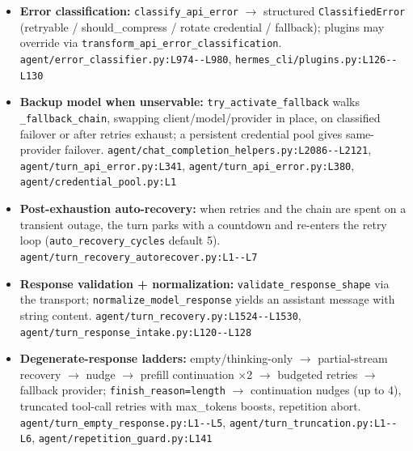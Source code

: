 \begin{itemize}
\item \textbf{Error classification:} \texttt{classify\_\allowbreak{}api\_\allowbreak{}error} $\rightarrow$ structured \texttt{ClassifiedError} (retryable / should\_compress / rotate credential / fallback); plugins may override via \texttt{transform\_\allowbreak{}api\_\allowbreak{}error\_\allowbreak{}classification}. \texttt{agent/\allowbreak{}error\_\allowbreak{}classifier.\allowbreak{}py:\allowbreak{}L974-\allowbreak{}-\allowbreak{}L980}, \texttt{hermes\_\allowbreak{}cli/\allowbreak{}plugins.\allowbreak{}py:\allowbreak{}L126-\allowbreak{}-\allowbreak{}L130}
\item \textbf{Backup model when unservable:} \texttt{try\_\allowbreak{}activate\_\allowbreak{}fallback} walks \texttt{\_\allowbreak{}fallback\_\allowbreak{}chain}, swapping client/model/provider in place, on classified failover or after retries exhaust; a persistent credential pool gives same-provider failover. \texttt{agent/\allowbreak{}chat\_\allowbreak{}completion\_\allowbreak{}helpers.\allowbreak{}py:\allowbreak{}L2086-\allowbreak{}-\allowbreak{}L2121}, \texttt{agent/\allowbreak{}turn\_\allowbreak{}api\_\allowbreak{}error.\allowbreak{}py:\allowbreak{}L341}, \texttt{agent/\allowbreak{}turn\_\allowbreak{}api\_\allowbreak{}error.\allowbreak{}py:\allowbreak{}L380}, \texttt{agent/\allowbreak{}credential\_\allowbreak{}pool.\allowbreak{}py:\allowbreak{}L1}
\item \textbf{Post-exhaustion auto-recovery:} when retries and the chain are spent on a transient outage, the turn parks with a countdown and re-enters the retry loop (\texttt{auto\_\allowbreak{}recovery\_\allowbreak{}cycles} default 5). \texttt{agent/\allowbreak{}turn\_\allowbreak{}recovery\_\allowbreak{}autorecover.\allowbreak{}py:\allowbreak{}L1-\allowbreak{}-\allowbreak{}L7}
\item \textbf{Response validation + normalization:} \texttt{validate\_\allowbreak{}response\_\allowbreak{}shape} via the transport; \texttt{normalize\_\allowbreak{}model\_\allowbreak{}response} yields an assistant message with string content. \texttt{agent/\allowbreak{}turn\_\allowbreak{}recovery.\allowbreak{}py:\allowbreak{}L1524-\allowbreak{}-\allowbreak{}L1530}, \texttt{agent/\allowbreak{}turn\_\allowbreak{}response\_\allowbreak{}intake.\allowbreak{}py:\allowbreak{}L120-\allowbreak{}-\allowbreak{}L128}
\item \textbf{Degenerate-response ladders:} empty/thinking-only $\rightarrow$ partial-stream recovery $\rightarrow$ nudge $\rightarrow$ prefill continuation $\times$2 $\rightarrow$ budgeted retries $\rightarrow$ fallback provider; \texttt{finish\_\allowbreak{}reason=length} $\rightarrow$ continuation nudges (up to 4), truncated tool-call retries with max\_tokens boosts, repetition abort. \texttt{agent/\allowbreak{}turn\_\allowbreak{}empty\_\allowbreak{}response.\allowbreak{}py:\allowbreak{}L1-\allowbreak{}-\allowbreak{}L5}, \texttt{agent/\allowbreak{}turn\_\allowbreak{}truncation.\allowbreak{}py:\allowbreak{}L1-\allowbreak{}-\allowbreak{}L6}, \texttt{agent/\allowbreak{}repetition\_\allowbreak{}guard.\allowbreak{}py:\allowbreak{}L141}

\end{itemize}
